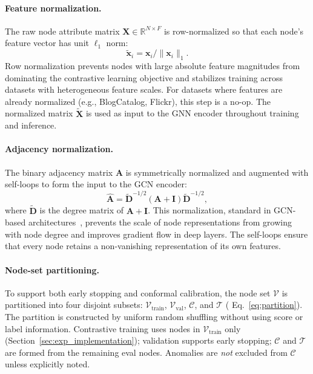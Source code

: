 \documentclass[a4paper]{cas-dc}
\theoremstyle{definition}
\begin{document}
\paragraph{Feature normalization.}
The raw node attribute matrix $\mathbf{X} \in \mathbb{R}^{N \times F}$ is row-normalized so that each node's feature vector has unit $\ell_1$ norm:
\begin{equation}
\label{eq:feat_norm}
\tilde{\mathbf{x}}_i = \mathbf{x}_i / \|\mathbf{x}_i\|_1.
\end{equation}
Row normalization prevents nodes with large absolute feature magnitudes from dominating the contrastive learning objective and stabilizes training across datasets with heterogeneous feature scales. For datasets where features are already normalized (e.g., BlogCatalog, Flickr), this step is a no-op. The normalized matrix $\tilde{\mathbf{X}}$ is used as input to the GNN encoder throughout training and inference.

\paragraph{Adjacency normalization.}
The binary adjacency matrix $\mathbf{A}$ is symmetrically normalized and augmented with self-loops to form the input to the GCN encoder:
\begin{equation}
\label{eq:adj_norm}
\hat{\mathbf{A}} = \widetilde{\mathbf{D}}^{-1/2}(\mathbf{A} + \mathbf{I})\widetilde{\mathbf{D}}^{-1/2},
\end{equation}
where $\widetilde{\mathbf{D}}$ is the degree matrix of $\mathbf{A} + \mathbf{I}$. This normalization, standard in GCN-based architectures~\cite{kipf2017gcn}, prevents the scale of node representations from growing with node degree and improves gradient flow in deep layers. The self-loops ensure that every node retains a non-vanishing representation of its own features.

\paragraph{Node-set partitioning.}
To support both early stopping and conformal calibration, the node set $\mathcal{V}$ is partitioned into four disjoint subsets: $\mathcal{V}_{\text{train}}$, $\mathcal{V}_{\text{val}}$, $\mathcal{C}$, and $\mathcal{T}$ ( Eq.~\eqref{eq:partition}). The partition is constructed by uniform random shuffling {without} using score or label information.  Contrastive training uses nodes in $\mathcal{V}_{\text{train}}$ only (Section~\ref{sec:exp_implementation}); validation supports early stopping; $\mathcal{C}$ and $\mathcal{T}$ are formed from the remaining eval nodes.  Anomalies are \emph{not} excluded from $\mathcal{C}$ unless explicitly noted.
\end{document}
